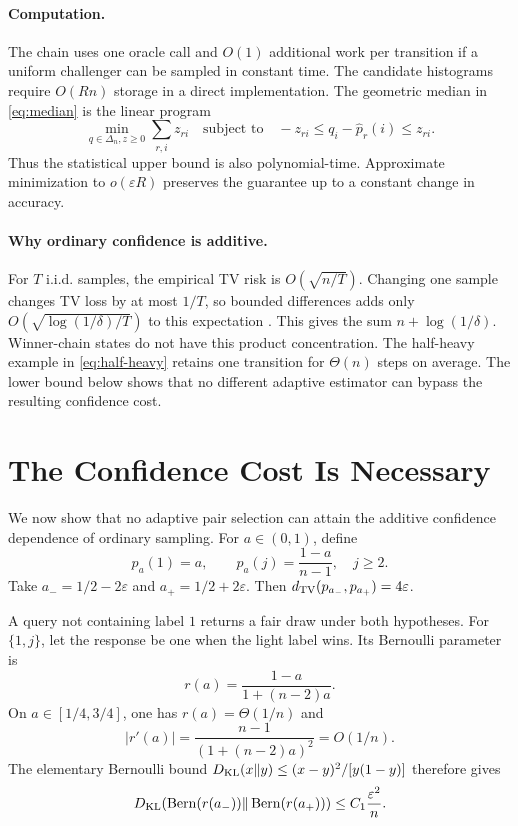 \documentclass[twoside]{article}
\newcommand{\TV}{d_{\rm TV}}
\begin{document}
\paragraph{Computation.}
The chain uses one oracle call and $O(1)$ additional work per transition if a uniform challenger can be sampled in constant time. The candidate histograms require $O(Rn)$ storage in a direct implementation. The geometric median in \eqref{eq:median} is the linear program \[ \min_{q\in\Delta_n,z\ge0}\sum_{r,i}z_{ri} \quad\text{subject to}\quad -z_{ri}\le q_i-\widehat p_r(i)\le z_{ri}. \] Thus the statistical upper bound is also polynomial-time. Approximate minimization to $o(\varepsilon R)$ preserves the guarantee up to a constant change in accuracy.

\paragraph{Why ordinary confidence is additive.}
For $T$ i.i.d. samples, the empirical TV risk is $O(\sqrt{n/T})$. Changing one sample changes TV loss by at most $1/T$, so bounded differences adds only $O(\sqrt{\log(1/\delta)/T})$ to this expectation \citep{canonne2020short}. This gives the sum $n+\log(1/\delta)$. Winner-chain states do not have this product concentration. The half-heavy example in \eqref{eq:half-heavy} retains one transition for $\Theta(n)$ steps on average. The lower bound below shows that no different adaptive estimator can bypass the resulting confidence cost.

\section{The Confidence Cost Is Necessary}
\label{sec:lower}

We now show that no adaptive pair selection can attain the additive confidence dependence of ordinary sampling. For $a\in(0,1)$, define
\begin{equation}
 p_a(1)=a,\qquad p_a(j)=\frac{1-a}{n-1},\quad j\ge2.
 \label{eq:hard-family}
\end{equation}
Take $a_-=1/2-2\varepsilon$ and $a_+=1/2+2\varepsilon$. Then $\TV(p_{a_-},p_{a_+})=4\varepsilon$.

A query not containing label $1$ returns a fair draw under both hypotheses. For $\{1,j\}$, let the response be one when the light label wins. Its Bernoulli parameter is
\begin{equation}
 r(a)=\frac{1-a}{1+(n-2)a}.
 \label{eq:rare-coin}
\end{equation}
On $a\in[1/4,3/4]$, one has $r(a)=\Theta(1/n)$ and
\begin{equation}
 |r'(a)|=\frac{n-1}{(1+(n-2)a)^2}=O(1/n).
 \label{eq:rare-derivative}
\end{equation}
The elementary Bernoulli bound $D_{\rm KL}(x\|y)\le(x-y)^2/[y(1-y)]$ therefore gives
\begin{equation}
 D_{\rm KL}(\operatorname{Bern}(r(a_-))\| 
 \operatorname{Bern}(r(a_+)))
 \le C_1\frac{\varepsilon^2}{n}.
 \label{eq:one-query-kl}
\end{equation}
\end{document}
